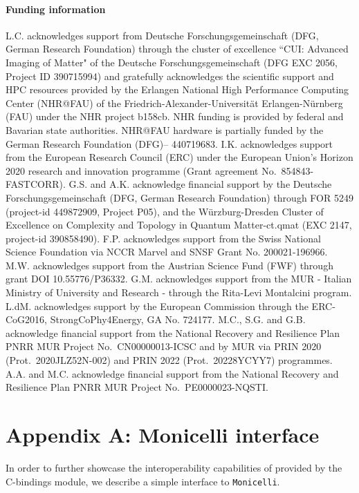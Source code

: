 \documentclass[edipack_sp.tex]{subfiles}
\begin{document}
\paragraph{Funding information}
L.C. acknowledges support from Deutsche Forschungsgemeinschaft (DFG, German Research Foundation) thr\-ough the cluster of excellence ``CUI: Advanced Imaging of Matter" of the Deutsche Forschungsgemeinschaft (DFG EXC 2056, Project ID 390715994) and gratefully acknowledges the scientific support and HPC resources provided by the Erlangen National High Performance Computing Center (NHR@FAU) of the Friedrich-Alexander-Universität Erlangen-Nürnberg (FAU) under the NHR project b158cb. NHR funding is provided by federal and Bavarian state authorities. NHR@FAU hardware is partially funded by the German Research Foundation (DFG)– 440719683.
I.K. acknowledges support from the European Research Council (ERC) under the European Union's Horizon 2020 research and innovation programme (Grant agreement No.~854843-FASTCORR).
G.S. and A.K. acknowledge financial support by the Deutsche Forschungsgemeinschaft (DFG, German Research Foundation) through FOR 5249 (project-id 449872909, Project P05), and the W\"urzburg-Dresden Cluster of Excellence on Complexity and Topology in Quantum Matter-ct.qmat (EXC 2147, project-id 390858490).
F.P. acknowledges support from the Swiss National Science Foundation via NCCR Marvel and SNSF Grant No. 200021-196966.
M.W. acknowledges support from the Austrian Science Fund (FWF) through grant DOI 10.55776/P36332.
G.M. acknowledges support from the MUR - Italian Ministry of University and Research - through the Rita-Levi Montalcini program.
L.dM. acknowledges support by the European Commission through the ERC-CoG2016, StrongCoPhy4Energy, GA No. 724177.
M.C., S.G. and G.B. acknowledge financial support from the National Recovery and Resilience Plan PNRR
MUR Project No.~CN00000013-ICSC and by MUR via PRIN 2020 (Prot.~2020JLZ52N-002) and PRIN 2022 (Prot.~20228YCYY7) programmes.
A.A. and M.C. acknowledge financial support from the National Recovery and Resilience Plan PNRR MUR Project No.~PE0000023-NQSTI. 




\section{Appendix A: Monicelli interface}\label{appendixA}
In order to further showcase the interoperability capabilities of
\NAME provided by the C-bindings module, we describe a simple interface to {\tt Monicelli}.
\end{document}
